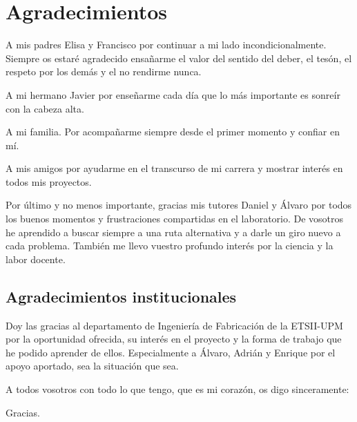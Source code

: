 \newpage
\thispagestyle{plain}

\chapter*{Agradecimientos} %

A mis padres Elisa y Francisco por continuar a mi lado incondicionalmente. Siempre os estaré agradecido ensañarme el valor del sentido del deber, el tesón, el respeto por los demás y el no rendirme nunca.

A mi hermano Javier por enseñarme cada día que lo más importante es sonreír con la cabeza alta.

A mi familia. Por acompañarme siempre desde el primer momento y confiar en mí.

A mis amigos por ayudarme en el transcurso de mi carrera y mostrar interés en todos mis proyectos.

Por último y no menos importante, gracias mis tutores Daniel y Álvaro por todos los buenos momentos y frustraciones compartidas en el laboratorio. De vosotros he aprendido a buscar siempre a una ruta alternativa y a darle un giro nuevo a cada problema. También me llevo vuestro profundo interés por la ciencia y la labor docente.

\section*{Agradecimientos institucionales}
Doy las gracias al departamento de Ingeniería de Fabricación de la ETSII-UPM por la oportunidad ofrecida,  su interés en el proyecto y la forma de  trabajo que he podido aprender de ellos. Especialmente a Álvaro, Adrián y Enrique por el apoyo aportado, sea la situación que sea.

\vspace{1.5 cm}
A todos vosotros con todo lo que tengo, que es mi corazón, os digo sinceramente:

Gracias.

\afterpage{\blankpage} %

